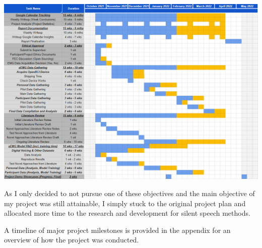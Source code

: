 \begin{center}
\includegraphics[scale=0.3]{graphics/planning/original_plan.png}
\end{center}

As I only decided to not pursue one of these objectives and
the main objective of my project was still attainable, I
simply stuck to the original project plan and allocated more
time to the research and development for silent speech
methods.

A timeline of major project milestones is provided in the
appendix for an overview of how the project was conducted.